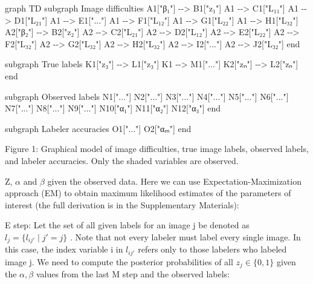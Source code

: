 \documentclass[
]{article}
\newenvironment{Shaded}{}{}
\newcommand{\NormalTok}[1]{#1}
\begin{document}
\begin{Shaded}
\begin{Highlighting}[]
\NormalTok{graph TD}
\NormalTok{    subgraph Image difficulties}
\NormalTok{        A1["β₁"] {-}{-}\textgreater{} B1["z₁"]}
\NormalTok{        A1 {-}{-}\textgreater{} C1["L₁₁"]}
\NormalTok{        A1 {-}{-}\textgreater{} D1["L₂₁"]}
\NormalTok{        A1 {-}{-}\textgreater{} E1["..."]}
\NormalTok{        A1 {-}{-}\textgreater{} F1["L₁₂"]}
\NormalTok{        A1 {-}{-}\textgreater{} G1["L₂₂"]}
\NormalTok{        A1 {-}{-}\textgreater{} H1["L₃₂"]}
\NormalTok{        A2["β₂"] {-}{-}\textgreater{} B2["z₂"]}
\NormalTok{        A2 {-}{-}\textgreater{} C2["L₂₁"]}
\NormalTok{        A2 {-}{-}\textgreater{} D2["L₁₂"]}
\NormalTok{        A2 {-}{-}\textgreater{} E2["L₂₂"]}
\NormalTok{        A2 {-}{-}\textgreater{} F2["L₃₂"]}
\NormalTok{        A2 {-}{-}\textgreater{} G2["L₃₂"]}
\NormalTok{        A2 {-}{-}\textgreater{} H2["L₃₂"]}
\NormalTok{        A2 {-}{-}\textgreater{} I2["..."]}
\NormalTok{        A2 {-}{-}\textgreater{} J2["L₃₂"]}
\NormalTok{    end}

\NormalTok{    subgraph True labels}
\NormalTok{        K1["z₃"] {-}{-}\textgreater{} L1["z₃"]}
\NormalTok{        K1 {-}{-}\textgreater{} M1["..."]}
\NormalTok{        K2["zₙ"] {-}{-}\textgreater{} L2["zₙ"]}
\NormalTok{    end}

\NormalTok{    subgraph Observed labels}
\NormalTok{        N1["..."]}
\NormalTok{        N2["..."]}
\NormalTok{        N3["..."]}
\NormalTok{        N4["..."]}
\NormalTok{        N5["..."]}
\NormalTok{        N6["..."]}
\NormalTok{        N7["..."]}
\NormalTok{        N8["..."]}
\NormalTok{        N9["..."]}
\NormalTok{        N10["α₁"]}
\NormalTok{        N11["α₂"]}
\NormalTok{        N12["α₃"]}
\NormalTok{    end}

\NormalTok{    subgraph Labeler accuracies}
\NormalTok{        O1["..."]}
\NormalTok{        O2["αₘ"]}
\NormalTok{    end}
\end{Highlighting}
\end{Shaded}

Figure 1: Graphical model of image difficulties, true image labels,
observed labels, and labeler accuracies. Only the shaded variables are
observed.

Z, \(\alpha\) and \(\beta\) given the observed data. Here we can use
Expectation-Maximization approach (EM) to obtain maximum likelihood
estimates of the parameters of interest (the full derivation is in the
Supplementary Materials):

E step: Let the set of all given labels for an image j be denoted as
\(l_{j} = \{l_{ij'} \mid j' = j\}\) . Note that not every labeler must
label every single image. In this case, the index variable i in
\(l_{ij'}\) refers only to those labelers who labeled image j. We need
to compute the posterior probabilities of all \(z_{j} \in \{0, 1\}\)
given the \(\alpha, \beta\) values from the last M step and the observed
labels:
\end{document}
